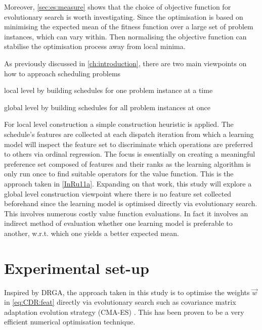 Moreover, \cref{sec:es:measure} shows that the choice of objective function  
for evolutionary search is worth investigating. Since the optimisation is based 
on minimising the expected mean of the fitness function over a large set of 
problem instances, which can vary within. Then normalising the objective 
function can stabilise the optimisation process away from local minima. 

As previously discussed in \cref{ch:introduction}, there are two main 
viewpoints on how to approach scheduling problems
\begin{enumerate*}
	\item local level by building schedules for one problem instance at a time
    \item global level by building schedules for all problem instances at once
\end{enumerate*}
For local level construction a simple construction heuristic is applied. The 
schedule's features are collected at each dispatch iteration from which a 
learning model will inspect the feature set to discriminate which operations 
are preferred to others via ordinal regression. The focus is essentially on 
creating a meaningful preference set composed of features and their ranks as 
the learning algorithm is only run once to find suitable operators for the 
value function. This is the approach taken in \cref{InRu11a}. Expanding on 
that  work, this study will explore a global level construction viewpoint where 
there is no feature set collected beforehand since the learning model is 
optimised directly via evolutionary search. This involves numerous costly value 
function evaluations. In fact it involves an indirect method of evaluation 
whether one learning model is preferable to another, w.r.t. which one yields a 
better expected mean. 

\section{Experimental set-up}\label{sec:expr}

Inspired by DRGA, the approach taken in this study is to optimise the weights 
$\vec{w}$ in \cref{eq:CDR:feat} directly via evolutionary search such as 
covariance matrix adaptation evolution strategy (CMA-ES) \cite{Hansen01}. This 
has been proven to be a very efficient numerical optimisation technique. 

